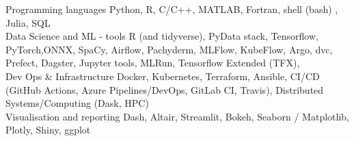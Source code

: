 


\begin{cvskills}


\cvskill
{Programming languages} %
{Python,  R, C/C++, MATLAB, Fortran, shell (bash) , Julia, SQL} %
\\



\cvskill
{Data Science and ML - tools} %
{ R (and tidyverse), PyData stack, Tensorflow, PyTorch,ONNX, SpaCy, Airflow, Pachyderm, MLFlow, KubeFlow, Argo, dvc, Prefect, Dagster, Jupyter tools, MLRun, Tensorflow Extended (TFX),   } %
\\


\cvskill
{Dev Ops \& Infrastructure } %
{Docker, Kubernetes, Terraform, Ansible, CI/CD (GitHub Actions, Azure Pipelines/DevOps, GitLab CI, Travis), Distributed Systems/Computing (Dask, HPC)} %
\\





\cvskill
{Visualisation and reporting } %
{Dash, Altair, Streamlit, Bokeh, Seaborn / Matplotlib, Plotly, Shiny, ggplot} %
\\


\end{cvskills}
